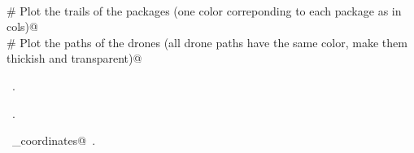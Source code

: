 \documentclass[10pt, english, oneside]{report}
\begin{document}
\begin{appendices}
\begin{flushleft}
\begin{minipage}{\linewidth}
\begin{list}{}{}
\mbox{}\verb@@\\
\mbox{}\verb@    # Plot the trails of the packages (one color correponding to each package as in cols)@\\
\mbox{}\verb@    # Plot the paths of the drones (all drone paths have the same color, make them thickish and transparent)@\\
\mbox{}\verb@@{\NWsep}
\end{list}
\vspace{-1.5ex}
\footnotesize
\begin{list}{}{\setlength{\itemsep}{-\parsep}\setlength{\itemindent}{-\leftmargin}}
\item \NWtxtMacroDefBy\ .
\item \NWtxtMacroRefIn\ .
\item \NWtxtIdentsUsed\nobreak\  \verb@extract_coordinates@\nobreak\ .
\item{}
\end{list}
\end{minipage}\vspace{4ex}
\end{flushleft}

                 


\end{appendices}
\listoftodos
\end{document}
